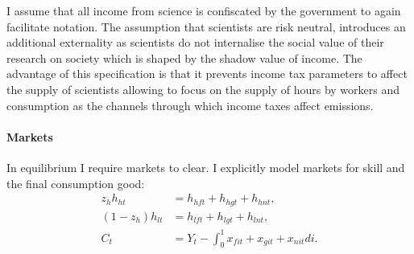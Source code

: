 I assume that all income from science is confiscated by the government to again facilitate notation. The assumption that scientists are risk neutral, introduces an additional externality as scientists do not internalise the social value of their research on society which is shaped by the shadow value of income. The advantage of this specification is that it prevents income tax parameters to affect the supply of scientists allowing to focus on the supply of hours by workers and consumption as the channels through which income taxes affect emissions. 
\begin{comment}
\paragraph{Impossibility of reaching target in laissez-faire with exogenous growth}
\tr{Note that this is wrong! There is an option for the gov to affect inflation which then redirects demand.}
Note that with exogenous growth in each sector there is no possibility for the government to stop emissions from growing, since production of the dirty good is essential for the consumption good (no perfect substitution: $\varepsilon<\infty$). To meet the emission target, the government either needs to affect the growth rate in the economy; i.e., $\upsilon_j$ is a choice variable, or work and consumption need to be set to zero; or the emission target has to be defined in relative terms. The latter possibility contradicts the Paris Agreement which is concerned with absolute emissions.  
I therefore assume, that the government can change the growth rate.

The government chooses the growth rate in each sector, taking into account that research is constrained by an exogenous  amount of scientists
\begin{align}
\upsilon_{ct}+\upsilon_{dt}\leq\Upsilon
\end{align}
\end{comment} 
  
\paragraph{Markets}
In equilibrium I require markets to clear. I explicitly model markets for skill and the final consumption good:
\begin{align}
z_h h_{ht}&=h_{hft}+h_{hgt}+h_{hnt},\\
(1-z_h) h_{lt}&=h_{lft}+h_{lgt}+h_{lnt},\\
C_t&=Y_t-\int_{0}^{1}x_{fit}+x_{git}+x_{nit}di.
\end{align}
